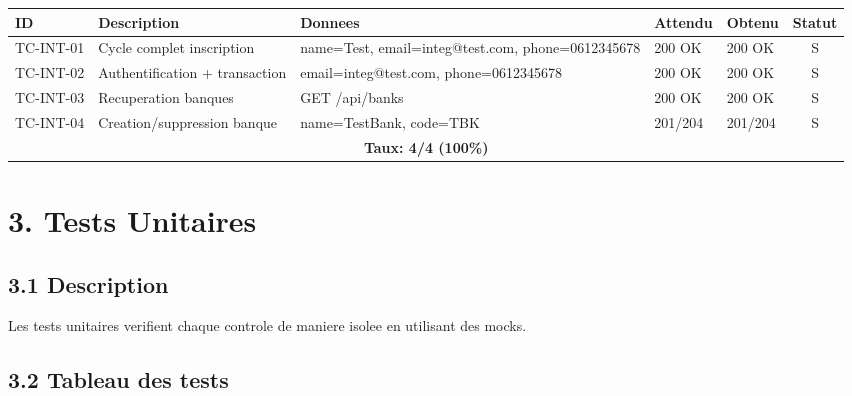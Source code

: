 \documentclass[12pt,a4paper]{article}
\begin{document}
\begin{longtable}{|p{2.5cm}|p{4cm}|p{4cm}|p{2.5cm}|p{2.5cm}|c|}
\hline
\rowcolor[gray]{0.9}
\textbf{ID} & \textbf{Description} & \textbf{Donnees} & \textbf{Attendu} & \textbf{Obtenu} & \textbf{Statut} \\
\hline
TC-INT-01 & Cycle complet inscription & name=Test, email=integ@test.com, phone=0612345678 & 200 OK & 200 OK & S \\
\hline
TC-INT-02 & Authentification + transaction & email=integ@test.com, phone=0612345678 & 200 OK & 200 OK & S \\
\hline
TC-INT-03 & Recuperation banques & GET /api/banks & 200 OK & 200 OK & S \\
\hline
TC-INT-04 & Creation/suppression banque & name=TestBank, code=TBK & 201/204 & 201/204 & S \\
\hline
\multicolumn{6}{|c|}{\textbf{Taux: 4/4 (100\%)}} \\
\hline
\end{longtable}

\newpage

\section*{3. Tests Unitaires}

\subsection*{3.1 Description}
Les tests unitaires verifient chaque controle de maniere isolee en utilisant des mocks.

\subsection*{3.2 Tableau des tests}
\end{document}
